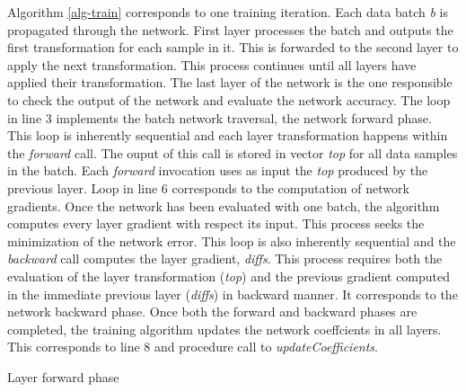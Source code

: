 Algorithm \ref{alg-train} corresponds to one training iteration. 
Each data batch \emph{b} is propagated through the network. 
First layer processes the batch and outputs the first transformation 
for each sample in it. This is forwarded to the 
second layer to apply the next transformation. This process continues 
until all layers have applied their transformation. The last layer 
of the network is the one responsible to check the output of the 
network and evaluate the network accuracy. The loop in line 3 implements 
the batch network traversal, the network forward phase.
This loop is inherently sequential and each layer 
transformation happens within the \emph{forward} call. The ouput of 
this call is stored in vector \emph{top} for all data samples in the 
batch. Each \emph{forward} invocation uses as input the \emph{top} 
produced by the previous layer. Loop in line 6 corresponds to the 
computation of network gradients. Once the network has been evaluated 
with one batch, the algorithm computes every layer gradient 
with respect its input. This process seeks the minimization 
of the network error. This loop is also inherently sequential and 
the \emph{backward} call computes the layer gradient, \emph{diffs}. 
This process requires both the evaluation of the layer transformation 
(\emph{top}) and the previous gradient computed in the immediate previous 
layer (\emph{diffs}) in backward manner. It corresponds to the network 
backward phase. Once both the forward and backward phases are completed, 
the training algorithm updates the network coeffcients in all layers. 
This corresponds to line 8 and procedure call to \emph{updateCoefficients}.

\begin{algorithm}
\caption{Layer forward phase}
\label{alg-forw}
\BlankLine
{}
\end{algorithm}

